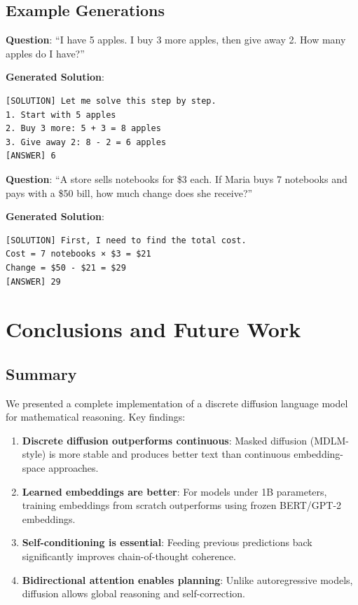 \documentclass[11pt,a4paper]{article}
\begin{document}
\subsection{Example Generations}

\textbf{Question}: ``I have 5 apples. I buy 3 more apples, then give away 2. How many apples do I have?''

\textbf{Generated Solution}:
\begin{verbatim}
[SOLUTION] Let me solve this step by step.
1. Start with 5 apples
2. Buy 3 more: 5 + 3 = 8 apples
3. Give away 2: 8 - 2 = 6 apples
[ANSWER] 6
\end{verbatim}

\textbf{Question}: ``A store sells notebooks for \$3 each. If Maria buys 7 notebooks and pays with a \$50 bill, how much change does she receive?''

\textbf{Generated Solution}:
\begin{verbatim}
[SOLUTION] First, I need to find the total cost.
Cost = 7 notebooks × $3 = $21
Change = $50 - $21 = $29
[ANSWER] 29
\end{verbatim}

\section{Conclusions and Future Work}

\subsection{Summary}

We presented a complete implementation of a discrete diffusion language model for mathematical reasoning. Key findings:

\begin{enumerate}
    \item \textbf{Discrete diffusion outperforms continuous}: Masked diffusion (MDLM-style) is more stable and produces better text than continuous embedding-space approaches.
    
    \item \textbf{Learned embeddings are better}: For models under 1B parameters, training embeddings from scratch outperforms using frozen BERT/GPT-2 embeddings.
    
    \item \textbf{Self-conditioning is essential}: Feeding previous predictions back significantly improves chain-of-thought coherence.
    
    \item \textbf{Bidirectional attention enables planning}: Unlike autoregressive models, diffusion allows global reasoning and self-correction.
\end{enumerate}
\end{document}
